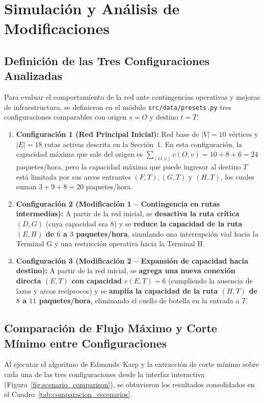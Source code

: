 \documentclass[11pt,a4paper]{article}
\begin{document}
\section{Simulación y Análisis de Modificaciones}

\subsection{Definición de las Tres Configuraciones Analizadas}
Para evaluar el comportamiento de la red ante contingencias operativas y mejoras de infraestructura, se definieron en el módulo \texttt{src/data/presets.py} tres configuraciones comparables con origen $s = O$ y destino $t = T$:
\begin{enumerate}
    \item \textbf{Configuración 1 (Red Principal Inicial):} Red base de $|V| = 10$ vértices y $|E| = 18$ rutas activas descrita en la Sección~1. En esta configuración, la capacidad máxima que sale del origen es $\sum_{(O,v)} c(O,v) = 10 + 8 + 6 = 24$ paquetes/hora, pero la capacidad máxima que puede ingresar al destino $T$ está limitada por sus arcos entrantes $(F, T), (G, T)$ y $(H, T)$, los cuales suman $3 + 9 + 8 = 20$ paquetes/hora.
    \item \textbf{Configuración 2 (Modificación 1 -- Contingencia en rutas intermedias):} A partir de la red inicial, se \textbf{desactiva la ruta crítica $(D, G)$} (cuya capacidad era $8$) y se \textbf{reduce la capacidad de la ruta $(E, H)$ de $6$ a $3$ paquetes/hora}, simulando una interrupción vial hacia la Terminal G y una restricción operativa hacia la Terminal H.
    \item \textbf{Configuración 3 (Modificación 2 -- Expansión de capacidad hacia destino):} A partir de la red inicial, se \textbf{agrega una nueva conexión directa $(E, T)$ con capacidad $c(E, T) = 6$} (cumpliendo la ausencia de lazos y arcos recíprocos) y se \textbf{amplía la capacidad de la ruta $(H, T)$ de $8$ a $11$ paquetes/hora}, eliminando el cuello de botella en la entrada a $T$.
\end{enumerate}

\subsection{Comparación de Flujo Máximo y Corte Mínimo entre Configuraciones}
Al ejecutar el algoritmo de Edmonds--Karp y la extracción de corte mínimo sobre cada una de las tres configuraciones desde la interfaz interactiva (Figura~\ref{fig:scenario_comparison}), se obtuvieron los resultados consolidados en el Cuadro~\ref{tab:comparacion_escenarios}.
\end{document}
